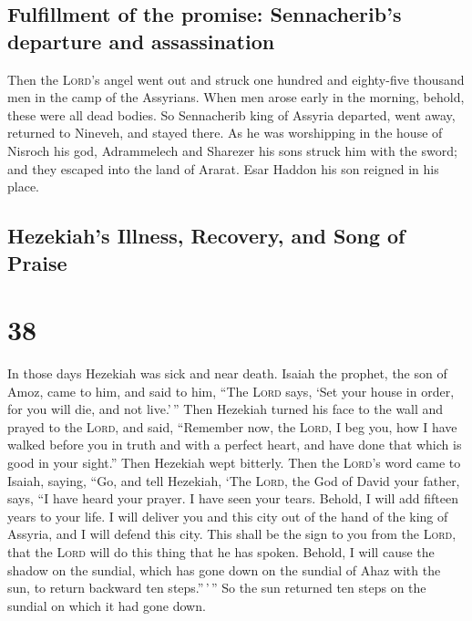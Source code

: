 \hypertarget{fulfillment-of-the-promise-sennacheribs-departure-and-assassination}{%
\subsection{Fulfillment of the promise: Sennacherib's departure and
assassination}\label{fulfillment-of-the-promise-sennacheribs-departure-and-assassination}}

 Then the \textsc{Lord}'s angel went out and struck one
hundred and eighty-five thousand men in the camp of the Assyrians. When
men arose early in the morning, behold, these were all dead bodies.
 So Sennacherib king of Assyria departed, went away,
returned to Nineveh, and stayed there.  As he was
worshipping in the house of Nisroch his god, Adrammelech and Sharezer
his sons struck him with the sword; and they escaped into the land of
Ararat. Esar Haddon his son reigned in his place.

\hypertarget{hezekiahs-illness-recovery-and-song-of-praise}{%
\subsection{Hezekiah's Illness, Recovery, and Song of
Praise}\label{hezekiahs-illness-recovery-and-song-of-praise}}

\hypertarget{section-37}{%
\section{38}\label{section-37}}

 In those days Hezekiah was sick and near death. Isaiah
the prophet, the son of Amoz, came to him, and said to him, ``The
\textsc{Lord} says, `Set your house in order, for you will die, and not
live.'\,''  Then Hezekiah turned his face to the wall and
prayed to the \textsc{Lord},  and said, ``Remember now,
the \textsc{Lord}, I beg you, how I have walked before you in truth and
with a perfect heart, and have done that which is good in your sight.''
Then Hezekiah wept bitterly.  Then the \textsc{Lord}'s
word came to Isaiah, saying,  ``Go, and tell Hezekiah,
`The \textsc{Lord}, the God of David your father, says, ``I have heard
your prayer. I have seen your tears. Behold, I will add fifteen years to
your life.  I will deliver you and this city out of the
hand of the king of Assyria, and I will defend this city. 
This shall be the sign to you from the \textsc{Lord}, that the
\textsc{Lord} will do this thing that he has spoken. 
Behold, I will cause the shadow on the sundial, which has gone down on
the sundial of Ahaz with the sun, to return backward ten steps.''\,'\,''
So the sun returned ten steps on the sundial on which it had gone down.

